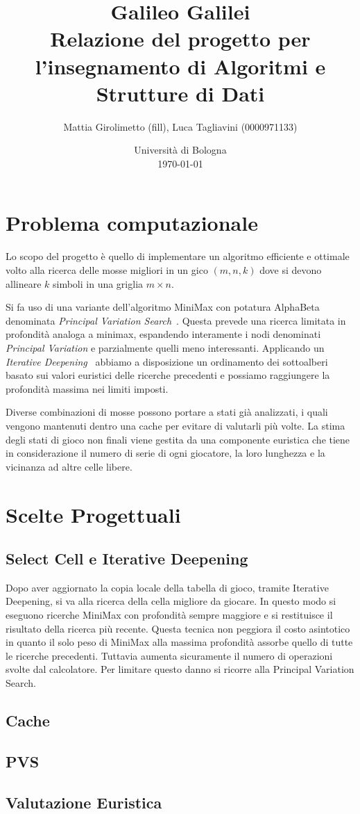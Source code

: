 \documentclass{article}
\title{Galileo Galilei \\
\large Relazione del progetto per l'insegnamento di Algoritmi e Strutture di Dati}
\author{
  Mattia Girolimetto (fill),
  Luca Tagliavini (0000971133)
}
\date{
	Universit\`a di Bologna \\
  \today
}
\begin{document}
\maketitle

\section{Problema computazionale}

Lo scopo del progetto \`e quello di implementare un algoritmo efficiente e ottimale
volto alla ricerca delle mosse migliori in un gico $(m,n,k)$ dove si devono
allineare $k$ simboli in una griglia $m \times n$.

Si fa uso di una variante dell'algoritmo MiniMax con potatura
AlphaBeta denominata \emph{Principal Variation Search}~\cite{negascout}. Questa prevede 
una ricerca limitata in profondit\`a analoga a minimax, espandendo %
interamente i nodi denominati \emph{Principal Variation} e parzialmente quelli
meno interessanti. Applicando un \emph{Iterative Deepening}~\cite{id} abbiamo %
a disposizione un ordinamento dei sottoalberi basato sui valori euristici delle
ricerche precedenti e possiamo raggiungere la profondit\`a massima nei limiti
imposti.

Diverse combinazioni di mosse possono portare a stati gi\`a analizzati, i quali
vengono mantenuti dentro una cache per evitare di valutarli pi\`u volte.
La stima degli stati di gioco non finali viene gestita da una componente euristica che
tiene in considerazione il numero di serie di ogni giocatore, la loro lunghezza
e la vicinanza ad altre celle libere.

\section{Scelte Progettuali}

\subsection{Select Cell e Iterative Deepening}

Dopo aver aggiornato la copia locale della tabella di gioco, tramite Iterative Deepening, si va alla ricerca
della cella migliore da giocare.
In questo modo si eseguono ricerche MiniMax con profondit\`a sempre maggiore
e si restituisce il risultato della ricerca pi\`u recente. Questa tecnica non
peggiora il costo asintotico in quanto il solo peso di MiniMax alla
massima profondit\`a assorbe %
quello di tutte le ricerche precedenti.
Tuttavia aumenta sicuramente il numero di operazioni svolte dal calcolatore.
Per limitare questo danno si ricorre alla Principal Variation Search.

\subsection{Cache}
\subsection{PVS}
\subsection{Valutazione Euristica}

\pagebreak


\end{document}

